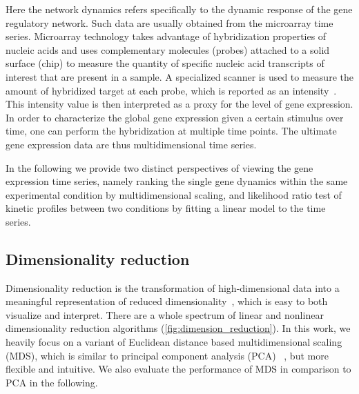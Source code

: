 Here the network dynamics refers specifically to the dynamic response of the 
gene regulatory network. Such data are usually obtained from the microarray
time series. Microarray technology takes advantage of hybridization properties 
of nucleic acids and uses complementary molecules (probes) attached to a solid 
surface 
(chip) to measure the quantity of specific nucleic acid transcripts of 
interest that are present in a sample. A specialized scanner is used to 
measure the amount of hybridized target at each probe, which is reported as an 
intensity~\citep{Gentleman2005}. This intensity value is then interpreted as a
proxy for the level of gene expression. In order to characterize the global 
gene expression given a certain stimulus over time, one can perform the 
hybridization at multiple time points. The ultimate gene expression data are
thus multidimensional time series. 

In the following we provide two distinct 
perspectives of viewing the gene expression time series, namely ranking the 
single gene dynamics within the same experimental condition by multidimensional
scaling, and likelihood ratio test of kinetic profiles between two conditions
by fitting a linear model to the time series.

\subsection{Dimensionality reduction}
Dimensionality reduction is the transformation of high-dimensional data into 
a meaningful representation of reduced dimensionality~\citep{Maaten2009}, 
which is easy to both visualize and interpret. There are a whole spectrum of linear
and nonlinear dimensionality reduction algorithms 
(\ref{fig:dimension_reduction}). In this work, we heavily 
focus on a variant of Euclidean distance based multidimensional 
scaling (MDS), which is similar to principal component analysis (PCA)%
~\citep{Haerdle2003},
but more flexible and intuitive. We also evaluate the performance of MDS in comparison to 
PCA in the following.


